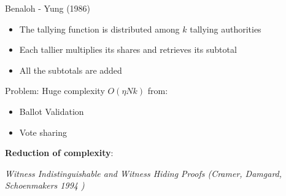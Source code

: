 \documentclass{beamer}
\begin{document}
\begin{frame}{Benaloh - Yung (1986) \cite{CY86}}

\begin{itemize}
\item The tallying function is distributed among $k$ tallying authorities
\item Each tallier multiplies its shares and retrieves its subtotal
\item All the subtotals are added
\end{itemize}

Problem: Huge complexity $O(\eta N k)$ from:

\begin{itemize}
	\item Ballot Validation
	\item Vote sharing
\end{itemize}

\textbf{Reduction of complexity}: 

\textit{Witness Indistinguishable and Witness Hiding Proofs (Cramer, Damgard, Schoenmakers 1994 \cite{CDS94})}
\end{frame}
\end{document}
